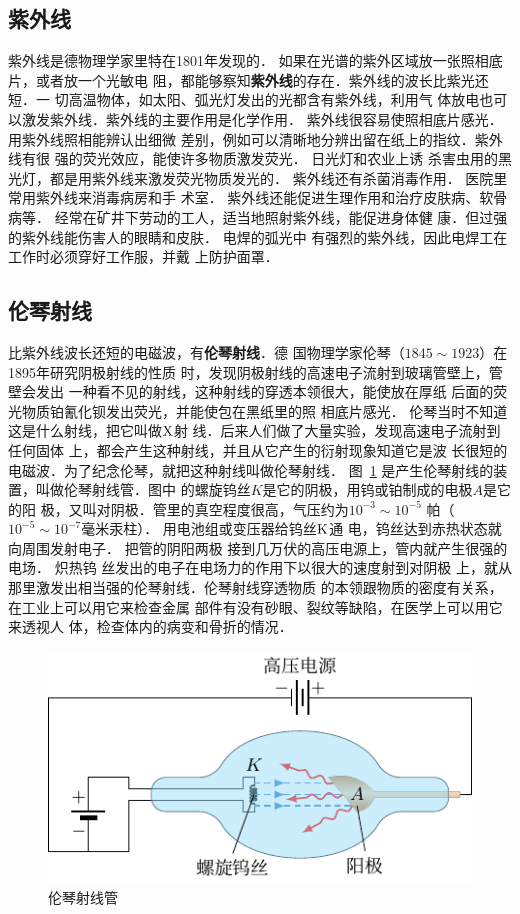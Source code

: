 \subsection{紫外线}

紫外线是德物理学家里特在1801年发现的．
如果在光谱的紫外区域放一张照相底片，或者放一个光敏电
阻，都能够察知\textbf{紫外线}的存在．紫外线的波长比紫光还短．一
切高温物体，如太阳、弧光灯发出的光都含有紫外线，利用气
体放电也可以激发紫外线．紫外线的主要作用是化学作用．
紫外线很容易使照相底片感光．用紫外线照相能辨认出细微
差别，例如可以清晰地分辨出留在纸上的指纹．紫外线有很
强的荧光效应，能使许多物质激发荧光．
日光灯和农业上诱
杀害虫用的黑光灯，都是用紫外线来激发荧光物质发光的．
紫外线还有杀菌消毒作用．
医院里常用紫外线来消毒病房和手
术室．
紫外线还能促进生理作用和治疗皮肤病、软骨病等．
经常在矿井下劳动的工人，适当地照射紫外线，能促进身体健
康．但过强的紫外线能伤害人的眼睛和皮肤．
电焊的弧光中
有强烈的紫外线，因此电焊工在工作时必须穿好工作服，并戴
上防护面罩．

\subsection{伦琴射线}
比紫外线波长还短的电磁波，有\textbf{伦琴射线}．德
国物理学家伦琴（$1845 \sim 1923$）在1895年研究阴极射线的性质
时，发现阴极射线的高速电子流射到玻璃管壁上，管壁会发出
一种看不见的射线，这种射线的穿透本领很大，能使放在厚纸
后面的荧光物质铂氰化钡发出荧光，并能使包在黑纸里的照
相底片感光．
伦琴当时不知道这是什么射线，把它叫做$\rm{X}$射
线．后来人们做了大量实验，发现高速电子流射到任何固体
上，都会产生这种射线，并且从它产生的衍射现象知道它是波
长很短的电磁波．为了纪念伦琴，就把这种射线叫做伦琴射线．
图~\ref{fig_C_6-16} 是产生伦琴射线的装置，叫做伦琴射线管．图中
的螺旋钨丝$K$是它的阴极，用钨或铂制成的电极$A$是它的阳
极，又叫对阴极．管里的真空程度很高，气压约为$10^{-3} \sim 10^{-5}$
帕（$10^{-5} \sim 10^{-7}$毫米汞柱）．
用电池组或变压器给钨丝$\rm{K}$通
电，钨丝达到赤热状态就向周围发射电子．
把管的阴阳两极
接到几万伏的高压电源上，管内就产生很强的电场．
炽热钨
丝发出的电子在电场力的作用下以很大的速度射到对阴极
上，就从那里激发出相当强的伦琴射线．伦琴射线穿透物质
的本领跟物质的密度有关系，在工业上可以用它来检查金属
部件有没有砂眼、裂纹等缺陷，在医学上可以用它来透视人
体，检查体内的病变和骨折的情况．
\begin{figure}[htbp]
    \centering
    \includegraphics{fig/C/6-16.pdf}
    \caption{伦琴射线管}\label{fig_C_6-16}
\end{figure}

